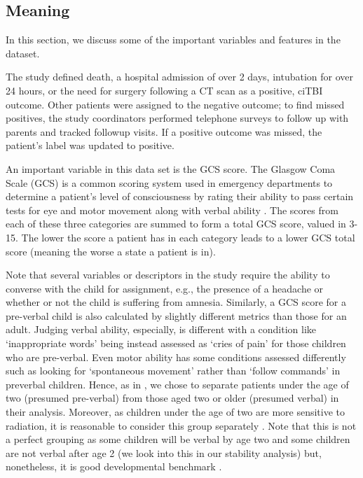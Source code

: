 \documentclass[11pt, letterpaper]{amsart}
\let\Oldsubsection\subsection
\renewcommand{\subsection}{\FloatBarrier\Oldsubsection}
\begin{document}
\subsection{Meaning}\label{ssec:datamean}


In this section, we discuss some of the important variables and features in the dataset. 

The study defined death, a hospital admission of over 2 days, intubation for over 24 hours, or the need for surgery following a CT scan as a positive, ciTBI outcome. Other patients were assigned to the negative outcome; to find missed positives, the study coordinators performed telephone surveys to follow up with parents and tracked followup visits. If a positive outcome was missed, the patient's label was updated to positive. 

An important variable in this data set is the GCS score. The Glasgow Coma Scale (GCS) is a common scoring system used in emergency departments to determine a patient's level of consciousness by rating their ability to pass certain tests for eye and motor movement along with verbal ability \cite{teasdale2014glasgow}. The scores from each of these three categories are summed to form a total GCS score, valued in 3-15. The lower the score a patient has in each category leads to a lower GCS total score (meaning the worse a state a patient is in). 

Note that several variables or descriptors in the study require the ability to converse with the child for assignment, e.g., the presence of a headache or whether or not the child is suffering from amnesia. Similarly, a GCS score for a pre-verbal child is also calculated by slightly different metrics than those for an adult. Judging verbal ability, especially, is different with a condition like `inappropriate words' being instead assessed as `cries of pain' for those children who are pre-verbal. Even motor ability has some conditions assessed differently such as looking for `spontaneous movement' rather than `follow commands' in preverbal children. Hence, as in \cite{kuppermann2009identification}, we chose to separate patients under the age of two (presumed pre-verbal) from those aged two or older (presumed verbal) in their analysis. Moreover, as children under the age of two are more sensitive to radiation, it is reasonable to consider this group separately \cite{brenner2002estimating}. Note that this is not a perfect grouping as some children will be verbal by age two and some children are not verbal after age 2 (we look into this in our stability analysis) but, nonetheless, it is good developmental benchmark \cite{blackwell2007pediatric}.
\end{document}
